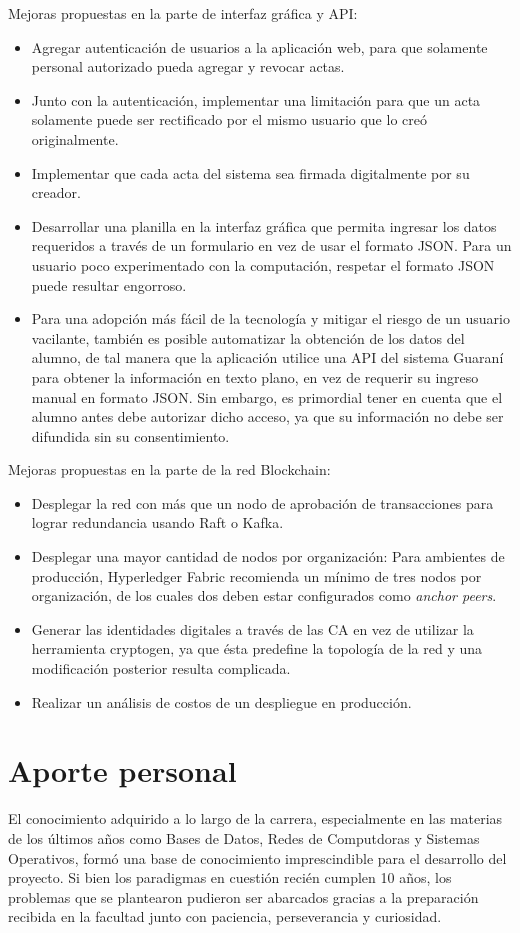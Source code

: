Mejoras propuestas en la parte de interfaz gráfica y API:
\begin{itemize}
    \item Agregar autenticación de usuarios a la aplicación web, para que solamente personal autorizado pueda agregar y revocar actas.
    \item Junto con la autenticación, implementar una limitación para que un acta solamente puede ser rectificado por el mismo usuario que lo creó originalmente.
    \item Implementar que cada acta del sistema sea firmada digitalmente por su creador.
    \item Desarrollar una planilla en la interfaz gráfica que permita ingresar los datos requeridos a través de un formulario en vez de usar el formato JSON. Para un usuario poco experimentado con la computación, respetar el formato JSON puede resultar engorroso.
    \item Para una adopción más fácil de la tecnología y mitigar el riesgo de un usuario vacilante, también es posible automatizar la obtención de los datos del alumno, de tal manera que la aplicación utilice una API del sistema Guaraní para obtener la información en texto plano, en vez de requerir su ingreso manual en formato JSON. Sin embargo, es primordial tener en cuenta que el alumno antes debe autorizar dicho acceso, ya que su información no debe ser difundida sin su consentimiento.
\end{itemize}

Mejoras propuestas en la parte de la red Blockchain:
\begin{itemize}
    \item Desplegar la red con más que un nodo de aprobación de transacciones para lograr redundancia usando Raft o Kafka.
    \item Desplegar una mayor cantidad de nodos por organización: Para ambientes de producción, Hyperledger Fabric recomienda un mínimo de tres nodos por organización, de los cuales dos deben estar configurados como \textit{anchor peers}.
    \item Generar las identidades digitales a través de las CA en vez de utilizar la herramienta cryptogen, ya que ésta predefine la topología de la red y una modificación posterior resulta complicada.
    \item Realizar un análisis de costos de un despliegue en producción.
\end{itemize}


\section{Aporte personal}
El conocimiento adquirido a lo largo de la carrera, especialmente en las materias de los últimos años como Bases de Datos, Redes de Computdoras y Sistemas Operativos, formó una base de conocimiento imprescindible para el desarrollo del proyecto. Si bien los paradigmas en cuestión recién cumplen 10 años, los problemas que se plantearon pudieron ser abarcados gracias a la preparación recibida en la facultad junto con paciencia, perseverancia y curiosidad. 